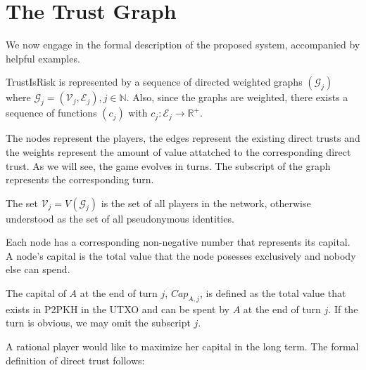 \documentclass[11pt]{llncs}
\theoremstyle{definition}
\begin{document}
  \section{The Trust Graph}
     We now engage in the formal description of the proposed system, accompanied by helpful examples.
     \begin{definition}[Graph]
        TrustIsRisk is represented by a sequence of directed weighted graphs $\left(\mathcal{G}_j\right)$ where $\mathcal{G}_j
        = \left(\mathcal{V}_j, \mathcal{E}_j\right), j \in \mathbb{N}$.
        Also, since the graphs are weighted, there exists a sequence of functions $\left(c_j\right)$ with $c_j : \mathcal{E}_j
        \rightarrow \mathbb{R}^{+}$.
     \end{definition}
     The nodes represent the players, the edges represent the existing direct trusts and the weights represent the amount of
     value attatched to the corresponding direct trust. As we will see, the game evolves in turns. The subscript of the graph
     represents the corresponding turn.
     \begin{definition}[Players]
        The set $\mathcal{V}_j = V\left(\mathcal{G}_j\right)$ is the set of all players in the network, otherwise understood
        as the set of all pseudonymous identities.
     \end{definition}
     Each node has a corresponding non-negative number that represents its capital. A node's capital is the total value that
     the node posesses exclusively and nobody else can spend.
     \begin{definition}[Capital]
        The capital of $A$ at the end of turn $j$, $Cap_{A, j}$, is defined as the total value that exists in P2PKH in the
        UTXO and can be spent by $A$ at the end of turn $j$. If the turn is obvious, we may omit the subscript $j$.
     \end{definition}
     A rational player would like to maximize her capital in the long term. The formal definition of direct trust follows:
\end{document}
